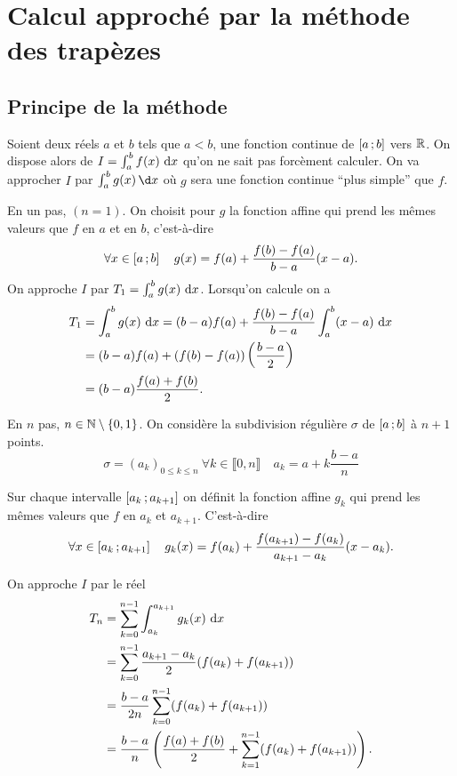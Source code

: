 \section{Calcul approché par la méthode des trapèzes}

\subsection{Principe de la méthode}

Soient deux réels \(a\) et \(b\) tels que \(a<b\), une fonction continue de 
\(\left[ a \, ; {} b \right]\) vers \(\mathbb{R}\). On dispose alors de \(I = \int_a^b 
f(x)\,\mathop{}\mathopen{}\mathrm{d} x\) qu'on ne sait pas forcèment calculer. On va approcher \(I\) par 
\(\int_a^bg(x)\,\d x\) où \(g\) sera une fonction continue ``plus simple'' que 
\(f\).

En un pas, \((n = 1)\). On choisit pour \(g\) la fonction affine qui prend les 
mêmes valeurs que \(f\) en \(a\) et en \(b\), c'est-à-dire
\begin{equation}
  \forall x \in \left[ a \, ; {} b \right] \quad g(x) = f(a) 
  +\frac{f(b)-f(a)}{b-a}(x-a).
\end{equation}
On approche \(I\) par \(T_1 = \int_a^bg(x)\,\mathop{}\mathopen{}\mathrm{d} x\). Lorsqu'on calcule on a
\begin{align*}
  T_1& = \int_a^bg(x)\,\mathop{}\mathopen{}\mathrm{d} x = (b-a)f(a) + \frac{f(b)-f(a)}{b-a} \int_a^b 
  (x-a)\,\mathop{}\mathopen{}\mathrm{d} x \\
  & = (b-a)f(a) + (f(b)-f(a))\left(\frac{b-a}{2}\right)\\
  & = (b-a) \frac{f(a)+f(b)}{2}.
\end{align*}

En \(n\) pas, \(n \in \mathbb{N}\setminus\{0,1\}\). On considère la subdivision 
régulière \(\sigma\) de \(\left[ a \, ; {} b \right]\) à \(n+1\) points.
\begin{equation}
  \sigma = (a_k)_{0 \leqslant k \leqslant n} \ \forall k \in \llbracket 0,n 
  \rrbracket \quad a_k = a+ k \frac{b-a}{n}
\end{equation}

Sur chaque intervalle \(\left[ a_k \, ; {} a_{k+1} \right]\) on définit la fonction 
affine \(g_k\) qui prend les mêmes valeurs que \(f\) en \(a_k\) et \(a_{k+1}\). 
C'est-à-dire
\begin{equation}
  \forall x \in \left[ a_k \, ; {} a_{k+1} \right] \quad g_k(x) = f(a_k) + 
  \frac{f(a_{k+1})-f(a_k)}{a_{k+1}-a_k}(x-a_{k}).
\end{equation}

On approche \(I\) par le réel
\begin{align*}
  T_n &= \sum_{k = 0}^{n-1} \int_{a_k}^{a_{k+1}} g_k(x)\,\mathop{}\mathopen{}\mathrm{d} x \\
  &= \sum_{k = 0}^{n-1} \frac{a_{k+1}-a_k}{2}(f(a_k)+f(a_{k+1}))\\
  & = \frac{b-a}{2n}  \sum_{k = 0}^{n-1}(f(a_k)+f(a_{k+1})) \\
  & = \frac{b-a}{n} \left(\frac{f(a)+f(b)}{2} + 
  \sum_{k = 1}^{n-1}(f(a_k)+f(a_{k+1})) \right).
\end{align*}

